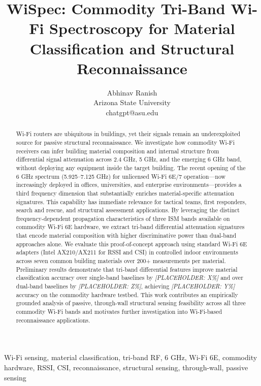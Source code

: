 \documentclass[conference]{IEEEtran}
\begin{document}
\title{WiSpec: Commodity Tri-Band Wi-Fi Spectroscopy for Material Classification and Structural Reconnaissance}

\author{Abhinav Ranish\\ Arizona State University\\ chatgpt@asu.edu}

\maketitle

\begin{abstract}
Wi-Fi routers are ubiquitous in buildings, yet their signals remain an underexploited source for passive structural reconnaissance. We investigate how commodity Wi-Fi receivers can infer building material composition and internal structure from differential signal attenuation across 2.4 GHz, 5 GHz, and the emerging 6 GHz band, without deploying any equipment inside the target building. The recent opening of the 6 GHz spectrum (5.925--7.125 GHz) for unlicensed Wi-Fi 6E/7 operation—now increasingly deployed in offices, universities, and enterprise environments—provides a third frequency dimension that substantially enriches material-specific attenuation signatures. This capability has immediate relevance for tactical teams, first responders, search and rescue, and structural assessment applications. By leveraging the distinct frequency-dependent propagation characteristics of three ISM bands available on commodity Wi-Fi 6E hardware, we extract tri-band differential attenuation signatures that encode material composition with higher discriminative power than dual-band approaches alone. We evaluate this proof-of-concept approach using standard Wi-Fi 6E adapters (Intel AX210/AX211 for RSSI and CSI) in controlled indoor environments across seven common building materials over 200+ measurements per material. Preliminary results demonstrate that tri-band differential features improve material classification accuracy over single-band baselines by \textit{[PLACEHOLDER: X\%]} and over dual-band baselines by \textit{[PLACEHOLDER: Z\%]}, achieving \textit{[PLACEHOLDER: Y\%]} accuracy on the commodity hardware testbed. This work contributes an empirically grounded analysis of passive, through-wall structural sensing feasibility across all three commodity Wi-Fi bands and motivates further investigation into Wi-Fi-based reconnaissance applications.
\end{abstract}

\begin{IEEEkeywords}
Wi-Fi sensing, material classification, tri-band RF, 6 GHz, Wi-Fi 6E, commodity hardware, RSSI, CSI, reconnaissance, structural sensing, through-wall, passive sensing
\end{IEEEkeywords}
\end{document}
